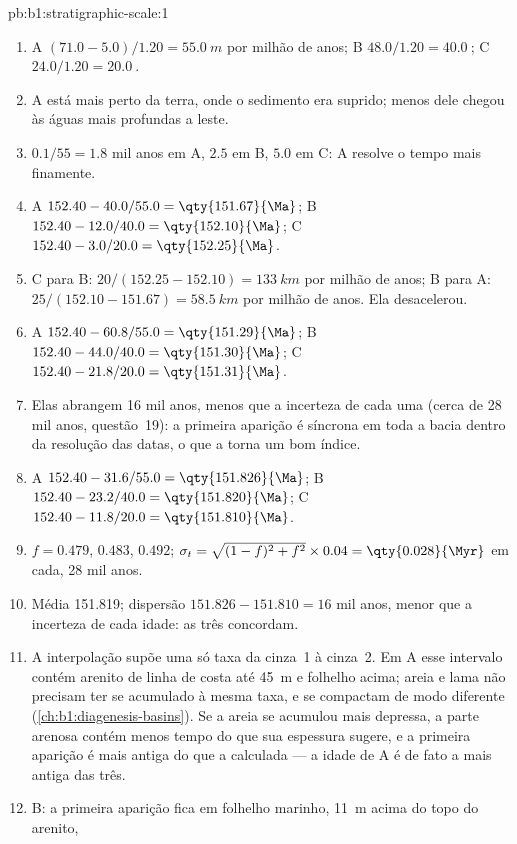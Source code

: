 \begin{solution}{pb:b1:stratigraphic-scale:1}
\begin{enumerate}
  \item A $(71.0 - 5.0)/1.20 = \qty{55.0}{m}$ por milhão de anos; B
        $48.0/1.20 = \qty{40.0}{}$; C $24.0/1.20 = \qty{20.0}{}$.
  \item A está mais perto da terra, onde o sedimento era suprido; menos dele chegou às águas
        mais profundas a leste.
  \item $0.1/55 = \num{1.8}$ mil anos em A, $\num{2.5}$ em B, $\num{5.0}$ em C: A resolve o
        tempo mais finamente.
  \item A $152.40 - 40.0/55.0 = \qty{151.67}{\Ma}$; B $152.40 - 12.0/40.0 =
        \qty{152.10}{\Ma}$; C $152.40 - 3.0/20.0 = \qty{152.25}{\Ma}$.
  \item C para B: $20/(152.25 - 152.10) = \qty{133}{km}$ por milhão de anos; B para A:
        $25/(152.10 - 151.67) = \qty{58.5}{km}$ por milhão de anos. Ela desacelerou.
  \item A $152.40 - 60.8/55.0 = \qty{151.29}{\Ma}$; B $152.40 - 44.0/40.0 =
        \qty{151.30}{\Ma}$; C $152.40 - 21.8/20.0 = \qty{151.31}{\Ma}$.
  \item Elas abrangem \num{16} mil anos, menos que a incerteza de cada uma (cerca de \num{28}
        mil anos, questão~19): a primeira aparição é síncrona em toda a bacia dentro da
        resolução das datas, o que a torna um bom índice.
  \item A $152.40 - 31.6/55.0 = \qty{151.826}{\Ma}$; B $152.40 - 23.2/40.0 =
        \qty{151.820}{\Ma}$; C $152.40 - 11.8/20.0 = \qty{151.810}{\Ma}$.
  \item $f = 0.479$, $0.483$, $0.492$; $\sigma_t = \sqrt{(1 - f)^2 + f^2} \times
        0.04 = \qty{0.028}{\Myr}$ em cada, \num{28} mil anos.
  \item Média \qty{151.819}{\Ma}; dispersão $151.826 - 151.810 = \num{16}$ mil anos, menor que
        a incerteza de cada idade: as três concordam.
  \item A interpolação supõe uma só taxa da cinza~1 à cinza~2. Em A esse intervalo contém
        arenito de linha de costa até \qty{45}{m} e folhelho acima; areia e lama não precisam ter
        se acumulado à mesma taxa, e se compactam de modo diferente
        (\cref{ch:b1:diagenesis-basins}). Se a areia se acumulou mais depressa, a parte arenosa
        contém menos tempo do que sua espessura sugere, e a primeira aparição é mais antiga do que
        a calculada --- a idade de A é de fato a mais antiga das três.
  \item B: a primeira aparição fica em folhelho marinho, \qty{11}{m} acima do topo do arenito,

\end{enumerate}
\end{solution}
